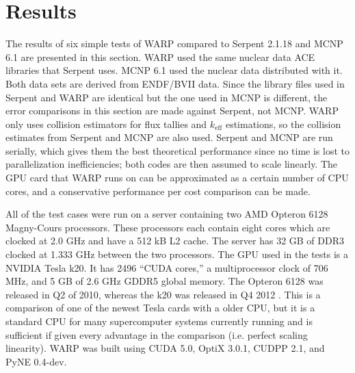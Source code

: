 \chapter{Results}
\label{chap:results}

The results of six simple tests of WARP compared to Serpent 2.1.18 and MCNP 6.1 are presented in this section.  WARP used the same nuclear data ACE libraries that Serpent uses.  MCNP 6.1 used the nuclear data distributed with it. Both data sets are derived from ENDF/BVII data. Since the library files used in Serpent and WARP are identical but the one used in MCNP is different, the error comparisons in this section are made against Serpent, not MCNP.  WARP only uses collision estimators for flux tallies and $k_\mathrm{eff}$ estimations, so the collision estimates from Serpent and MCNP are also used.  %
Serpent and MCNP are run serially, which gives them the best theoretical performance since no time is lost to parallelization inefficiencies; both codes are then assumed to scale linearly.  The GPU card that WARP runs on can be approximated as a certain number of CPU cores, and a conservative performance per cost comparison can be made.

All of the test cases were run on a server containing two AMD Opteron 6128 Magny-Cours processors.  These processors each contain eight cores which are clocked at 2.0 GHz and have a 512 kB L2 cache.  The server has 32 GB of DDR3 clocked at 1.333 GHz between the two processors.  The GPU used in the tests is a NVIDIA Tesla k20.  It has 2496 ``CUDA cores,'' a multiprocessor clock of 706 MHz, and 5 GB of 2.6 GHz GDDR5 global memory.  The Opteron 6128 was released in Q2 of 2010, whereas the k20 was released in Q4 2012 \cite{opterondate,k20date}.  This is a comparison of one of the newest Tesla cards with a older CPU, but it is a standard CPU for many supercomputer systems currently running and is sufficient if given every advantage in the comparison (i.e. perfect scaling linearity).  WARP was built using CUDA 5.0, OptiX 3.0.1, CUDPP 2.1, and PyNE 0.4-dev.

